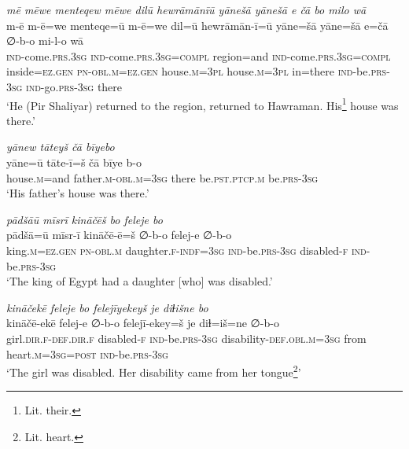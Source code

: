 \ea \label{ŽP.141}
\textit{mē mēwe menteqew mēwe dilū hewrāmānīū yānešā yānešā e čā bo milo wā} \\ 
\gll m-ē m-ē=we menteqe=ū m-ē=we dil=ū hewrāmān-ī=ū yāne=šā yāne=šā e=čā ∅-b-o mi-l-o wā \\ 
 \textsc{ind-}come\textsc{.prs}\textsc{.3sg} \textsc{ind-}come\textsc{.prs}\textsc{.3sg}\textsc{=compl} region=and \textsc{ind-}come\textsc{.prs}\textsc{.3sg}\textsc{=compl} inside\textsc{\textsc{=ez.gen}} \textsc{pn}\textsc{-obl}\textsc{.m}\textsc{\textsc{=ez.gen}} house\textsc{.m}\textsc{=3pl} house\textsc{.m}\textsc{=3pl} in=there \textsc{ind-}be\textsc{.prs}\textsc{-3sg} \textsc{ind-}go\textsc{.prs}\textsc{-3sg} there \\ 
\glt `He (Pir Shaliyar) returned to the region, returned to Hawraman. His\footnote{Lit. their.} house was there.'
\z 
 
\ea \label{ŽP.142}
\textit{yānew tāteyš čā bīyebo} \\ 
\gll yāne=ū tāte-ī=š čā bīye b-o \\ 
 house\textsc{.m}=and father\textsc{.m}\textsc{-obl}\textsc{.m}\textsc{=3sg} there be\textsc{.pst}\textsc{.ptcp}\textsc{.m} be\textsc{.prs}\textsc{-3sg} \\ 
\glt `His father’s house was there.'
\z 
 
\ea \label{ŽP.146}
\textit{pādšāū mīsrī kināčēš bo feleje bo} \\ 
\gll pādšā=ū mīsr-ī kināčē-ē=š ∅-b-o felej-e ∅-b-o \\ 
 king\textsc{.m}\textsc{\textsc{=ez.gen}} \textsc{pn}\textsc{-obl}\textsc{.m} daughter\textsc{.f}\textsc{-indf}\textsc{=3sg} \textsc{ind-}be\textsc{.prs}\textsc{-3sg} disabled\textsc{-f} \textsc{ind-}be\textsc{.prs}\textsc{-3sg} \\ 
\glt `The king of Egypt had a daughter [who] was disabled.'
\z 
 
\ea \label{ŽP.149}
\textit{kināčekē feleje bo felejīyekeyš je diɫišne bo} \\ 
\gll kināčē-ekē felej-e ∅-b-o felejī-ekey=š je diɫ=iš=ne ∅-b-o \\ 
 girl\textsc{.dir}\textsc{.f}\textsc{-def}\textsc{.dir}\textsc{.f} disabled\textsc{-f} \textsc{ind-}be\textsc{.prs}\textsc{-3sg} disability\textsc{-def}\textsc{.obl}\textsc{.m}\textsc{=3sg} from heart\textsc{.m}\textsc{=3sg}\textsc{=\textsc{post}} \textsc{ind-}be\textsc{.prs}\textsc{-3sg} \\ 
\glt `The girl was disabled. Her disability came from her tongue\footnote{Lit. heart.}'
\z 
 
